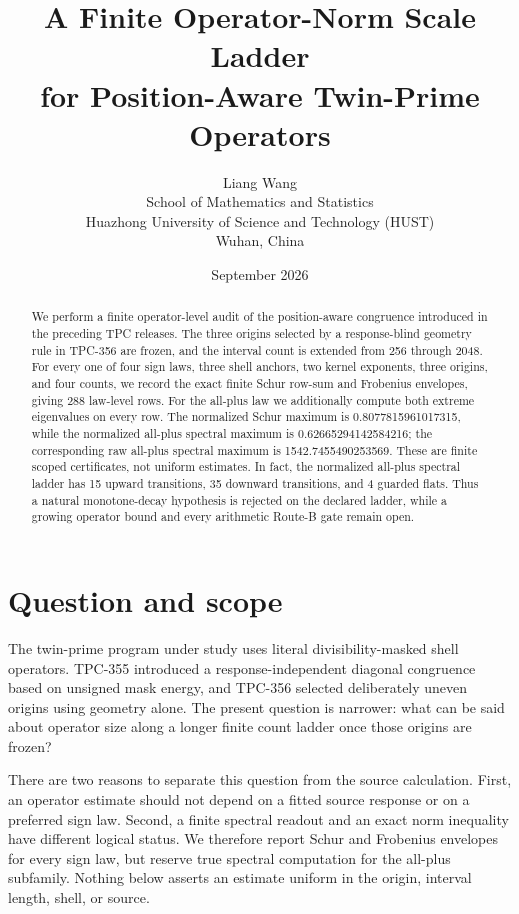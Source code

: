 \documentclass[10pt]{article}
\title{A Finite Operator-Norm Scale Ladder\\
for Position-Aware Twin-Prime Operators}
\author{Liang Wang\\
\small School of Mathematics and Statistics\\
\small Huazhong University of Science and Technology (HUST)\\
\small Wuhan, China}
\date{September 2026}
\newcommand{\TPC}{\textsc{TPC}}
\begin{document}
\maketitle

\begin{abstract}
We perform a finite operator-level audit of the position-aware congruence
introduced in the preceding \TPC{} releases.  The three origins selected by
a response-blind geometry rule in TPC-356 are frozen, and the interval count
is extended from 256 through 2048.  For every one of four sign laws, three
shell anchors, two kernel exponents, three origins, and four counts, we record
the exact finite Schur row-sum and Frobenius envelopes, giving 288 law-level
rows.  For the all-plus law we additionally compute both extreme eigenvalues
on every row.  The normalized Schur maximum is
0.8077815961017315, while the normalized all-plus spectral maximum is
0.62665294142584216; the corresponding raw all-plus spectral maximum is
1542.7455490253569.  These are finite scoped certificates, not uniform
estimates.  In fact, the normalized all-plus spectral ladder has 15 upward
transitions, 35 downward transitions, and 4 guarded flats.  Thus a natural
monotone-decay hypothesis is rejected on the declared ladder, while a growing
operator bound and every arithmetic Route-B gate remain open.
\end{abstract}

\section{Question and scope}

The twin-prime program under study uses literal divisibility-masked shell
operators.  TPC-355 introduced a response-independent diagonal congruence
based on unsigned mask energy, and TPC-356 selected deliberately uneven
origins using geometry alone.  The present question is narrower: what can be
said about operator size along a longer finite count ladder once those origins
are frozen?

There are two reasons to separate this question from the source calculation.
First, an operator estimate should not depend on a fitted source response or
on a preferred sign law.  Second, a finite spectral readout and an exact norm
inequality have different logical status.  We therefore report Schur and
Frobenius envelopes for every sign law, but reserve true spectral computation
for the all-plus subfamily.  Nothing below asserts an estimate uniform in the
origin, interval length, shell, or source.
\end{document}
